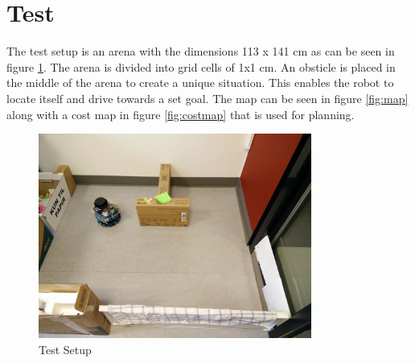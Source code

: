 \section{Test}
The test setup is an arena with the dimensions 113 x 141 cm as can be seen in figure \ref{fig:testsetup}. The arena is divided into grid cells of 1x1 cm. An obsticle is placed in the middle of the arena to create a unique situation. This enables the robot to locate itself and drive towards a set goal. The map can be seen in figure \ref{fig:map} along with a cost map in figure \ref{fig:costmap} that is used for planning.
\begin{figure}[H]
\centering
\includegraphics[width=0.8\textwidth]{billeder/testsetup}
\caption{Test Setup}
\label{fig:testsetup}
\end{figure}

